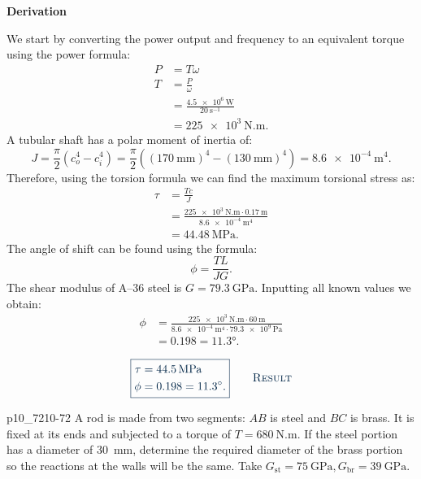 \documentclass[a4paper]{article}
\newcounter{problem}
\numberwithin{equation}{problem}
\newcommand{\AUheading}[1]{%
  \par\vspace{.4\baselineskip}%
  {\sffamily\bfseries\color{AUblueDark}#1\par}%
  \nobreak%
}
\newenvironment{derivation}[1][Derivation]{%
  \AUheading{#1}
  \begingroup\allowdisplaybreaks
  \setlength{\abovedisplayskip}{6pt}%
  \setlength{\belowdisplayskip}{6pt}%
  \setlength{\abovedisplayshortskip}{4pt}%
  \setlength{\belowdisplayshortskip}{4pt}%
}{\par\endgroup\medskip}
\newcommand{\finalresult}[1]{%
  \vspace{.2\baselineskip}%
  \begin{equation}
    {\color{AUblueDark}\boxed{\displaystyle #1}}
    \tag*{\textsc{\textcolor{AUblueDark}{Result}}}
  \end{equation}
  \newpage
}
\begin{document}
\begin{derivation}
  We start by converting the power output and frequency to an equivalent torque using the power formula:
  \begin{align*}
    P &= T \omega \\
    T &= \frac{P}{\omega} \\
      &= \frac{\qty{4,5e6}{\W} }{\qty{20}{\s^{-1}}} \\
      &= \qty{225e3}{\N.\m} 
  .\end{align*}
  A tubular shaft has a polar moment of inertia of:
  \[ 
  J = \frac{\pi}{2} \left( c_o^{4} - c_i^{4} \right) = \frac{\pi}{2} \left( \left( \qty{170}{\mm}  \right)^{4} - \left( \qty{130}{\mm}  \right)^{4} \right) = \qty{8,6e-4}{\m^{4}} 
  .\]
  Therefore, using the torsion formula we can find the maximum torsional stress as:
  \begin{align*}
  \tau &= \frac{T c}{J} \\
       &= \frac{\qty{225e3}{\N.\m} \cdot \qty{0,17}{\m}}{\qty{8,6e-4}{\m^{4}} } \\
       &=   \qty{44,48}{\MPa}
  .\end{align*}
  The angle of shift can be found using the formula:
  \[ 
  \phi = \frac{TL}{JG}
  .\]
  The shear modulus of A--36 steel is $G = \qty{79,3}{\GPa}$. 
  Inputting all known values we obtain:
  \begin{align*}
    \phi &= \frac{\qty{225e3}{\N.\m} \cdot \qty{60}{\m} }{\qty{8,6e-4}{\m^{4}} \cdot \qty{79,3e9}{\Pa}} \\
         &= \num{0,198} = \ang{11,3} 
  .\end{align*}
\end{derivation}

\finalresult{
  \begin{aligned}
    \tau &= \qty{44,5}{\MPa} \\
    \phi &= \num{0,198} = \ang{11,3} 
  .\end{aligned}
}


\begin{problemwithimage}{p10_72}{10-72}
  A rod is made from two segments: $AB$ is steel and $BC$ is brass.
  It is fixed at its ends and subjected to a torque of $T = \qty{680}{\N.\m}$.
  If the steel portion has a diameter of \qty{30}{\mm}, determine the required diameter of the brass portion so the reactions at the walls will be the same.
  Take $G_{\mathrm{st}} = \qty{75}{\GPa}, G_{\mathrm{br}} = \qty{39}{\GPa}$.
\end{problemwithimage}
\end{document}
